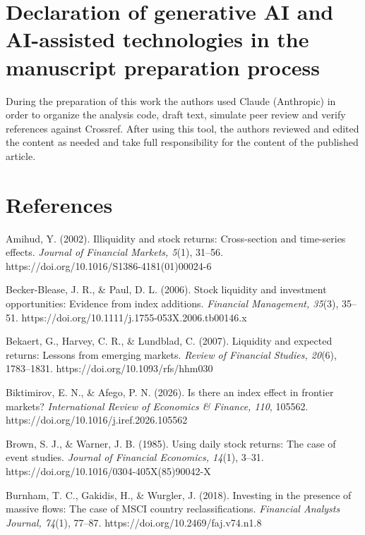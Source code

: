 \hypertarget{declaration-of-generative-ai-and-ai-assisted-technologies-in-the-manuscript-preparation-process}{%
\section{Declaration of generative AI and AI-assisted technologies in
the manuscript preparation
process}\label{declaration-of-generative-ai-and-ai-assisted-technologies-in-the-manuscript-preparation-process}}

During the preparation of this work the authors used Claude (Anthropic)
in order to organize the analysis code, draft text, simulate peer review
and verify references against Crossref. After using this tool, the
authors reviewed and edited the content as needed and take full
responsibility for the content of the published article.

\hypertarget{references}{%
\section{References}\label{references}}

Amihud, Y. (2002). Illiquidity and stock returns: Cross-section and
time-series effects. \emph{Journal of Financial Markets, 5}(1), 31--56.
https://doi.org/10.1016/S1386-4181(01)00024-6

Becker-Blease, J. R., \& Paul, D. L. (2006). Stock liquidity and
investment opportunities: Evidence from index additions. \emph{Financial
Management, 35}(3), 35--51.
https://doi.org/10.1111/j.1755-053X.2006.tb00146.x

Bekaert, G., Harvey, C. R., \& Lundblad, C. (2007). Liquidity and
expected returns: Lessons from emerging markets. \emph{Review of
Financial Studies, 20}(6), 1783--1831.
https://doi.org/10.1093/rfs/hhm030

Biktimirov, E. N., \& Afego, P. N. (2026). Is there an index effect in
frontier markets? \emph{International Review of Economics \& Finance,
110}, 105562. https://doi.org/10.1016/j.iref.2026.105562

Brown, S. J., \& Warner, J. B. (1985). Using daily stock returns: The
case of event studies. \emph{Journal of Financial Economics, 14}(1),
3--31. https://doi.org/10.1016/0304-405X(85)90042-X

Burnham, T. C., Gakidis, H., \& Wurgler, J. (2018). Investing in the
presence of massive flows: The case of MSCI country reclassifications.
\emph{Financial Analysts Journal, 74}(1), 77--87.
https://doi.org/10.2469/faj.v74.n1.8

